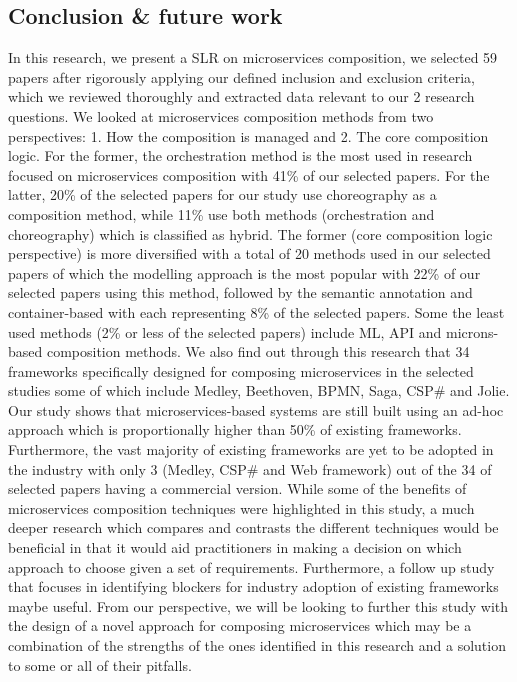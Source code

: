 \documentclass{article}
\begin{document}
\begin{multicols}{2}
\section{Conclusion \& future work}

In this research, we present a SLR on microservices composition, we selected 59 papers after rigorously applying our defined inclusion and exclusion criteria, which we reviewed thoroughly and extracted data relevant to our 2 research questions. We looked at microservices composition methods from two perspectives: 1. How the composition is managed and 2. The core composition logic. For the former, the orchestration method is the most used in research focused on microservices composition with 41\% of our selected papers. For the latter, 20\% of the selected papers for our study use choreography as a composition method, while 11\% use both methods (orchestration and choreography) which is classified as hybrid. The former (core composition logic perspective) is more diversified with a total of 20 methods used in our selected papers of which the modelling approach is the most popular with 22\% of our selected papers using this method, followed by the semantic annotation and container-based with each representing 8\% of the selected papers. Some the least used methods (2\% or less of the selected papers) include ML, API and microns-based composition methods. We also find out through this research that 34 frameworks specifically designed for composing microservices in the selected studies some of which include Medley, Beethoven, BPMN, Saga, CSP\# and Jolie. Our study shows that microservices-based systems are still built using an ad-hoc approach which is proportionally higher than 50\% of existing frameworks. Furthermore, the vast majority of existing frameworks are yet to be adopted in the industry with only 3 (Medley, CSP\# and Web framework) out of the 34 of selected papers having a commercial version.
While some of the benefits of microservices composition techniques were highlighted in this study, a much deeper research which compares and contrasts the different techniques would be beneficial in that it would aid practitioners in making a decision on which approach to choose given a set of requirements. Furthermore, a follow up study that focuses in identifying blockers for industry adoption of existing frameworks maybe useful. From our perspective, we will be looking to further this study with the design of a novel approach for composing microservices which may be a combination of the strengths of the ones identified in this research and a solution to some or all of their pitfalls.

\end{multicols}
\pagebreak 
\end{document}
